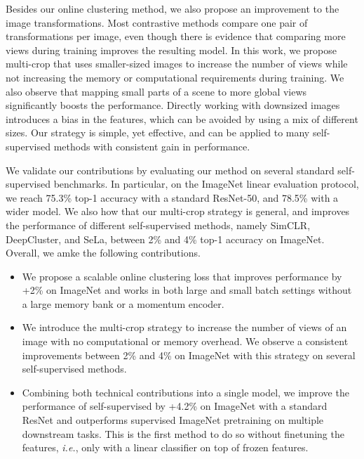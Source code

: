 \documentclass[conference]{IEEEtran}
\begin{document}
Besides our online clustering method, we also propose an improvement to the image transformations. Most contrastive methods compare one pair of transformations per image, even though there is evidence that comparing more views during training improves the resulting model.
In this work, we propose multi-crop that uses smaller-sized images to increase the number of views while not increasing the memory or computational requirements during training.
We also observe that mapping small parts of a scene to more global views significantly boosts the performance.
Directly working with downsized images introduces a bias in the features, which can be avoided by using a mix of different sizes.
Our strategy is simple, yet effective, and can be applied to many self-supervised methods with consistent gain in performance.

We validate our contributions by evaluating our method on several standard self-supervised benchmarks. 
In particular, on the ImageNet linear evaluation protocol, we reach 75.3\% top-1 accuracy with a standard ResNet-50, and 78.5\% with a wider model. 
We also how that our multi-crop strategy is general, and improves the performance of different self-supervised methods, namely SimCLR, DeepCluster, and SeLa, between 2\% and 4\% top-1 accuracy on ImageNet. 
Overall, we amke the following contributions.

\begin{itemize}
    \item We propose a scalable online clustering loss that improves performance by +2\% on ImageNet and works in both large and small batch settings without a large memory bank or a momentum encoder.
    \item We introduce the multi-crop strategy to increase the number of views of an image with no computational or memory overhead. We observe a consistent improvements between 2\% and 4\% on ImageNet with this strategy on several self-supervised methods.
    \item Combining both technical contributions into a single model, we improve the performance of self-supervised by +4.2\% on ImageNet with a standard ResNet and outperforms supervised ImageNet pretraining on multiple downstream tasks.
    This is the first method to do so without finetuning the features, \textit{i.e.}, only with a linear classifier on top of frozen features.
\end{itemize}
\end{document}
